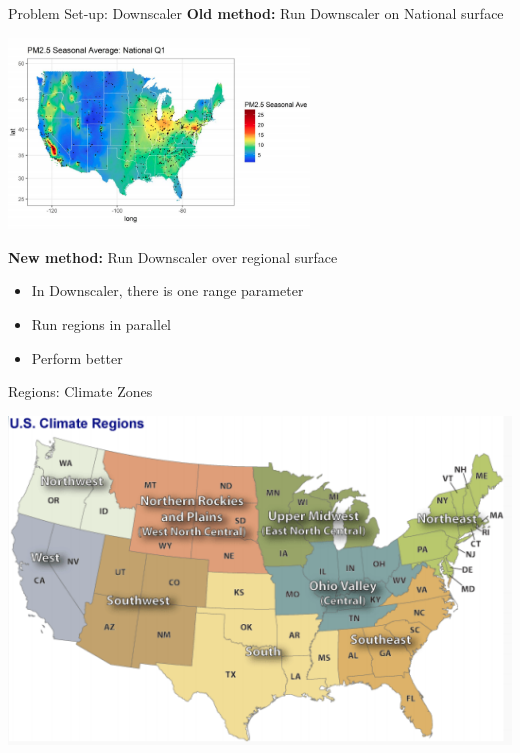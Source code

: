 \documentclass{beamer}
\begin{document}
\begin{frame}{Problem Set-up: Downscaler}
\textbf{Old method:} Run Downscaler on National surface
\begin{center}
\includegraphics[width=0.6\textwidth]{NationalDS.png}
\end{center}

\textbf{New method:} Run Downscaler over regional surface
\begin{itemize}
\item In Downscaler, there is one range parameter
\item Run regions in parallel
\item Perform better
\end{itemize}


\end{frame}

\begin{frame}{Regions: Climate Zones}
\vspace{-5mm}
\begin{center}
\includegraphics[width=1.0\textwidth]{ContUS.png}
\end{center}
\end{frame}
\end{document}

